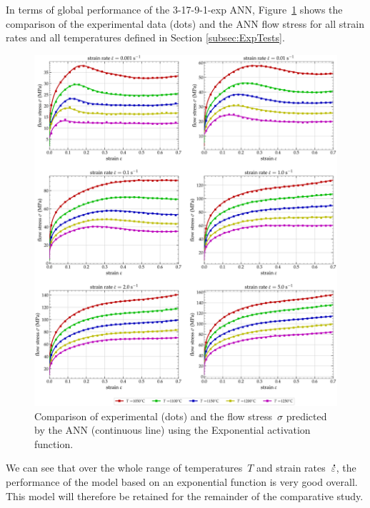 \documentclass[algorithms,article,submit,pdftex,oneauthors]{Definitions/mdpi}
\DeclareRobustCommand{\mdot}[1]{\accentset{\mbox{\bfseries .}}{#1}}
\begin{document}
In terms of global performance of the 3-17-9-1-exp ANN, Figure~\ref{fig:ANN-ExpFit} shows the comparison of the experimental data (dots) and the ANN flow stress for all strain rates and all temperatures defined in Section \ref{subsec:ExpTests}.
\begin{figure}[h]
\centering
\includegraphics[width=0.95\columnwidth]{Figures/3Cr2Mo-3-17-9-1-exponential}
\caption{Comparison of experimental (dots) and the flow stress~$\sigma$ predicted by the ANN (continuous line) using the Exponential activation function.}
\label{fig:ANN-ExpFit}
\end{figure}
We can see that over the whole range of temperatures~$T$ and strain rates~$\mdot{\varepsilon}$, the performance of the model based on an exponential function is very good overall.
This model will therefore be retained for the remainder of the comparative study.

\end{document}

